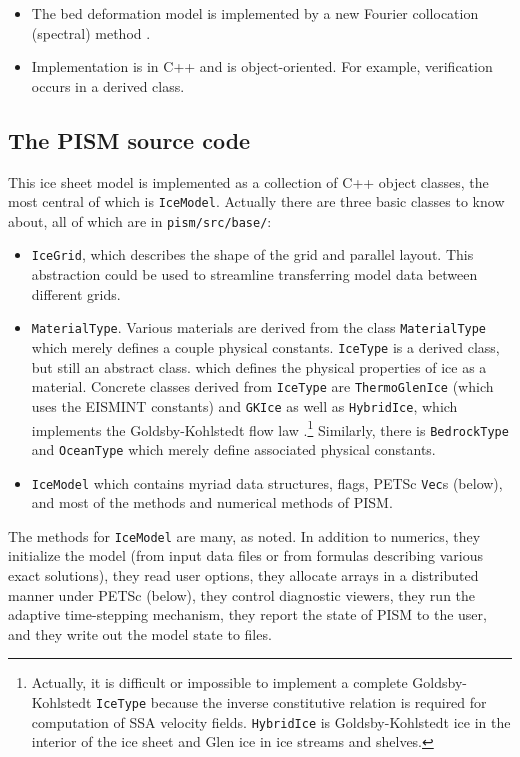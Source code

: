 \documentclass[11pt,final]{amsart}
\renewcommand{\t}[1]{\texttt{#1}}
\begin{document}
\begin{itemize}
\item The bed deformation model is implemented by a new Fourier collocation (spectral) method \cite{BLKfastearth}.
\item Implementation is in C++ and is object-oriented.  For example, verification occurs in a derived class.
\end{itemize}


\subsection{The PISM source code} This ice sheet model is implemented as a collection of C++ object classes, the most central of which is \t{IceModel}.  Actually there are three basic classes to know about, all of which are in \verb|pism/src/base/|:
\begin{itemize}
\item \t{IceGrid}, which describes the shape of the grid and parallel
layout. This abstraction could be used to streamline transferring model data between
different grids.
\item \t{MaterialType}.  Various materials are derived from the class \t{MaterialType} which merely defines a couple physical constants. \t{IceType} is a derived class, but still an abstract class. which defines the physical properties of ice as a material.  Concrete classes derived from \t{IceType} are \t{ThermoGlenIce} (which uses the
EISMINT constants) and \t{GKIce} as well as \t{HybridIce}, which implements the Goldsby-Kohlstedt flow law \cite{GoldsbyKohlstedt}.\footnote{Actually, it is difficult or impossible to implement a complete Goldsby-Kohlstedt \t{IceType} because the inverse constitutive relation is required for computation of SSA velocity fields. \t{HybridIce} is Goldsby-Kohlstedt ice in the interior of the ice sheet and Glen ice in ice streams and
shelves.}  Similarly, there is \t{BedrockType} and \t{OceanType} which merely define
associated physical constants.
\item \t{IceModel} which contains myriad data structures, flags, PETSc \verb|Vec|s (below), and most of the methods and numerical methods of PISM.\end{itemize}

The methods for \t{IceModel} are many, as noted.  In addition to numerics, they initialize the model (from input data files or from formulas describing various exact solutions), they read user options, they allocate arrays in a distributed manner under PETSc (below), they control diagnostic viewers, they run the adaptive time-stepping mechanism, they report the state of PISM to the user, and they write out the model state to files.
\end{document}
